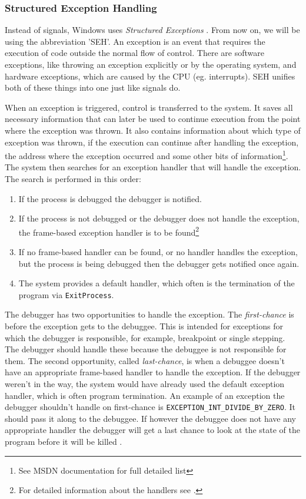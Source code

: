 \subsubsection*{Structured Exception Handling}
Instead of signals, Windows uses \textit{Structured Exceptions}
\cite{windows-msdn-seh}. From now on, we will be using the abbreviation 'SEH'.
An exception is an event that requires the execution of code outside the normal
flow of control. There are software exceptions, like throwing an exception
explicitly or by the operating system, and hardware exceptions, which are
caused by the CPU (eg. interrupts). SEH unifies both of these things into one
just like signals do.

When an exception is triggered, control is transferred to the system. It saves
all necessary information that can later be used to continue execution from the
point where the exception was thrown. It also contains information about which
type of exception was thrown, if the execution can continue after handling the
exception, the address where the exception occurred and some other bits of
information\footnote{See MSDN documentation \cite{windows-msdn-seh} for full
detailed list}. The system then searches for an exception handler that will
handle the exception. The search is performed in this order:

\begin{enumerate}
    \item If the process is debugged the debugger is notified.
    \item If the process is not debugged or the debugger does not handle the
        exception, the frame-based exception handler is to be
        found\footnote{For detailed information about the handlers see
        \cite{windows-msdn-seh}.}
    \item If no frame-based handler can be found, or no handler handles the
        exception, but the process is being debugged then the debugger gets
        notified once again.
    \item The system provides a default handler, which often is the termination of
        the program via \texttt{ExitProcess}.
\end{enumerate}

The debugger has two opportunities to handle the exception. The
\textit{first-chance} is before the exception gets to the debuggee. This is
intended for exceptions for which the debugger is responsible, for example,
breakpoint or single stepping. The debugger should handle these because the
debuggee is not responsible for them. The second opportunity, called
\textit{last-chance}, is when a debuggee doesn't have an appropriate frame-based
handler to handle the exception. If the debugger weren't in the way, the system
would have already used the default exception handler, which is often program
termination. An example of an exception the debugger shouldn't handle on
first-chance is \texttt{EXCEPTION\_INT\_DIVIDE\_BY\_ZERO}. It should pass it
along to the debuggee. If however the debuggee does not have any appropriate
handler the debugger will get a last chance to look at the state of the program
before it will be killed \cite{windows-msdn-dbg-exc-handling}.

